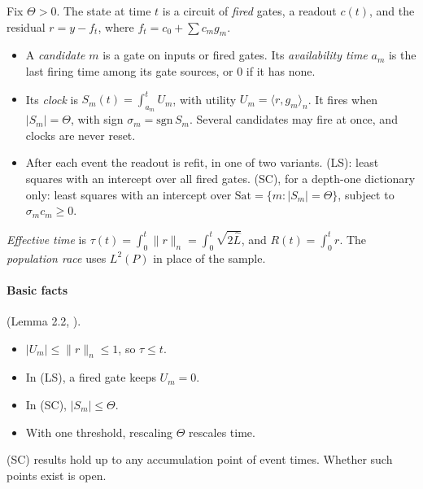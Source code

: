 \begin{definition}\label{def:app-race}
Fix $\Theta>0$. The state at time $t$ is a circuit of \emph{fired} gates, a readout $c(t)$, and the residual $r=y-f_t$, where $f_t=c_0+\sum c_mg_m$.
\begin{itemize}[nosep]
\item A \emph{candidate} $m$ is a gate on inputs or fired gates. Its \emph{availability time} $a_m$ is the last firing time among its gate sources, or $0$ if it has none.
\item Its \emph{clock} is $S_m(t)=\int_{a_m}^tU_m$, with utility $U_m=\langle r,g_m\rangle_n$. It fires when $|S_m|=\Theta$, with sign $\sigma_m=\mathrm{sgn}\,S_m$. Several candidates may fire at once, and clocks are never reset.
\item After each event the readout is refit, in one of two variants. (LS): least squares with an intercept over all fired gates. (SC), for a depth-one dictionary only: least squares with an intercept over $\mathrm{Sat}=\{m:|S_m|=\Theta\}$, subject to $\sigma_mc_m\ge0$.
\end{itemize}
\emph{Effective time} is $\tau(t)=\int_0^t\|r\|_n=\int_0^t\sqrt{2\hat L}$, and $R(t)=\int_0^tr$. The \emph{population race} uses $L^2(P)$ in place of the sample.
\end{definition}

\paragraph{Basic facts} (Lemma 2.2, ).
\begin{itemize}[nosep]
\item $|U_m|\le\|r\|_n\le1$, so $\tau\le t$.
\item In (LS), a fired gate keeps $U_m=0$.
\item In (SC), $|S_m|\le\Theta$.
\item With one threshold, rescaling $\Theta$ rescales time.
\end{itemize}
(SC) results hold up to any accumulation point of event times. Whether such points exist is open.

